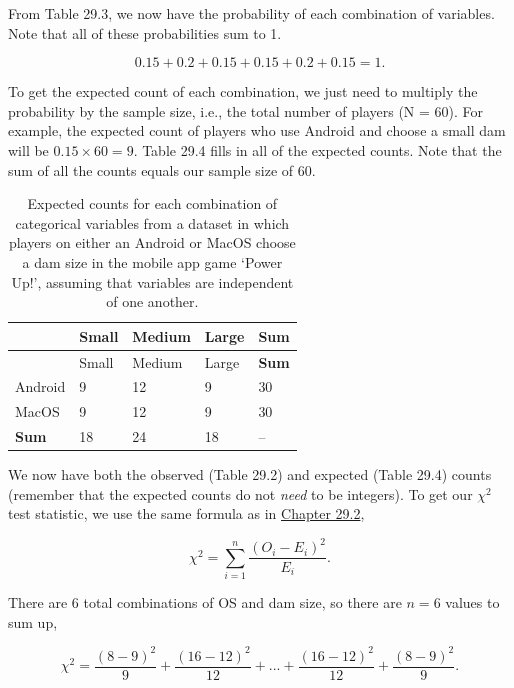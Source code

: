\documentclass[
]{scrbook}
\begin{document}
From Table 29.3, we now have the probability of each combination of variables.
Note that all of these probabilities sum to 1.

\[0.15 + 0.2 + 0.15 + 0.15 + 0.2 + 0.15 = 1.\]

To get the expected count of each combination, we just need to multiply the probability by the sample size, i.e., the total number of players (N = 60).
For example, the expected count of players who use Android and choose a small dam will be \(0.15 \times 60 = 9\).
Table 29.4 fills in all of the expected counts.
Note that the sum of all the counts equals our sample size of 60.

\begin{longtable}[]{@{}lllll@{}}
\caption{\label{tab:unnamed-chunk-143}Expected counts for each combination of categorical variables from a dataset in which players on either an Android or MacOS choose a dam size in the mobile app game `Power Up!', assuming that variables are independent of one another.}\tabularnewline
\toprule
& Small & Medium & Large & \textbf{Sum} \\
\midrule
\endfirsthead
\toprule
& Small & Medium & Large & \textbf{Sum} \\
\midrule
\endhead
Android & 9 & 12 & 9 & 30 \\
MacOS & 9 & 12 & 9 & 30 \\
\textbf{Sum} & 18 & 24 & 18 & -- \\
\bottomrule
\end{longtable}

We now have both the observed (Table 29.2) and expected (Table 29.4) counts (remember that the expected counts do not \emph{need} to be integers).
To get our \(\chi^{2}\) test statistic, we use the same formula as in \protect\hyperlink{chi-squared-goodness-of-fit}{Chapter 29.2},

\[\chi^{2} = \sum_{i = 1}^{n} \frac{\left(O_{i} - E_{i}\right)^{2}}{E_{i}}.\]

There are 6 total combinations of OS and dam size, so there are \(n = 6\) values to sum up,

\[\chi^{2} = \frac{(8-9)^2}{9} + \frac{(16 - 12)^{2}}{12} + ... + \frac{(16 - 12)^{2}}{12} + \frac{(8-9)^2}{9}.\]
\end{document}
